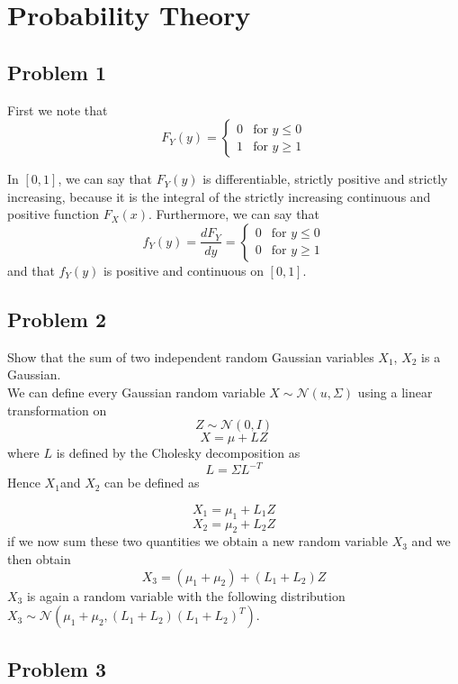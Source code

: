 \section{Probability Theory}


\subsection*{Problem 1}
First we note that 
\[F_Y(y) = \begin{cases}
            0 & \text{for } y\leq 0 \\
            1 & \text{for } y\geq 1
           \end{cases}
\]

In $[0,1]$, we can say that $F_Y(y)$ is differentiable, strictly positive and strictly increasing, because it is
the integral of the strictly increasing continuous and positive function $F_X(x)$. Furthermore, we can say that
\[ f_Y(y) = \frac{dF_Y}{dy} = \begin{cases}
                                0 & \text{for } y\leq 0 \\
                                0 & \text{for } y\geq 1
                               \end{cases}
\] and that $f_Y(y)$ is positive and continuous on $[0,1]$.


\subsection*{Problem 2}

Show that the sum of two independent random Gaussian variables $X_{1}$,
$X_{2}$ is a Gaussian. \\
We can define every Gaussian random variable $X\sim\mathcal{N}(u,\Sigma)$
using a linear transformation on 
\[
Z\sim\mathcal{N}(0,I)
\]
\[
X=\mu+LZ
\]
 where $L$ is defined by the Cholesky decomposition as 
 \[
 L=\Sigma L^{-T}
 \]
 Hence $X_{1}$and $X_{2}$ can be defined as

 \[
 X_{1}=\mu_{1}+L_{1}Z
 \]
 \[
 X_{2}=\mu_{2}+L_{2}Z
 \]
  if we now sum these two quantities we obtain a new random variable
      $X_{3}$ and we then obtain
      \[
      X_{3}=(\mu_{1}+\mu_{2})+(L_{1}+L_{2})Z
      \]
       $X_{3}$ is again a random variable with the following distribution
       $X_{3}\sim\mathcal{N}(\mu_{1}+\mu_{2},(L_{1}+L_{2})(L_{1}+L_{2})^{T})$.

\subsection*{Problem 3}

